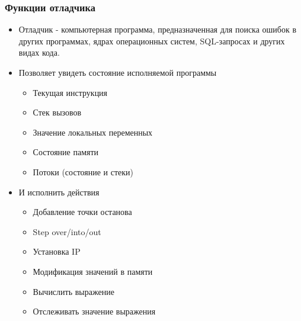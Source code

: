 \begin{frame}
\frametitle{Функции отладчика} %
\begin{itemize}
	\item Отладчик - компьютерная программа, предназначенная для поиска ошибок в других программах, ядрах операционных систем, SQL-запросах и других видах кода.
	\item Позволяет увидеть состояние исполняемой программы
	\begin{itemize}
		\item Текущая инструкция
		\item Стек вызовов
		\item Значение локальных переменных
		\item Состояние памяти
		\item Потоки (состояние и стеки)
	\end{itemize}
	\item И исполнить действия
	\begin{itemize}
		\item Добавление точки останова
		\item Step over/into/out
		\item Установка IP
		\item Модификация значений в памяти
		\item Вычислить выражение
		\item Отслеживать значение выражения
	\end{itemize}
\end{itemize}
\end{frame}